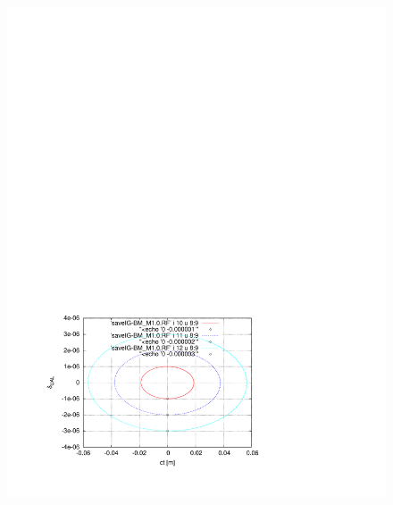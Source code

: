 \documentclass[]{article}
\begin{document}
\begin{figure}[h]
\begin{minipage}{\linewidth}
\centering
\vskip -2cm
\includegraphics[scale=0.8]{pdf/LongitPhSp_BM_M1p0.pdf}
\end{minipage}
%
\begin{minipage}{\linewidth}
\centering

\end{minipage}
\end{figure}
\end{document}

